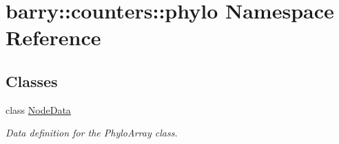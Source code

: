 \hypertarget{namespacebarry_1_1counters_1_1phylo}{}\section{barry\+:\+:counters\+:\+:phylo Namespace Reference}
\label{namespacebarry_1_1counters_1_1phylo}
\subsection*{Classes}
\begin{DoxyCompactItemize}
\item 
class \hyperlink{classbarry_1_1counters_1_1phylo_1_1_node_data}{Node\+Data}
\begin{DoxyCompactList}\small\item\em Data definition for the {\ttfamily Phylo\+Array} class. \end{DoxyCompactList}\end{DoxyCompactItemize}
